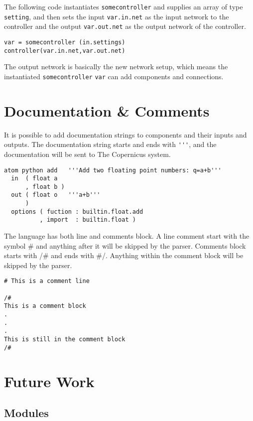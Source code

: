 The following code instantiates \verb#somecontroller# and supplies an
array of type \verb#setting#, and then sets the input
\verb#var.in.net# as the input network to the controller and the
output \verb#var.out.net# as the output network of the controller. 

\begin{verbatim}
var = somecontroller (in.settings)
controller(var.in.net,var.out.net)
\end{verbatim}

The output network is basically the new network setup, which means the
instantiated \verb#somecontroller# \verb#var# can add components and
connections.

\section{Documentation \& Comments}
It is possible to add documentation strings to components and their
inputs and outputs. The documentation string starts and ends with
\verb#'''#, and the documentation will be sent to The Copernicus
system.

\begin{verbatim}
atom python add   '''Add two floating point numbers: q=a+b'''
  in  ( float a
      , float b )
  out ( float o   '''a+b'''
      )
  options ( fuction : builtin.float.add
          , import  : builtin.float )
\end{verbatim}

The language has both line and comments block. A line comment start
with the symbol \# and anything after it will be skipped by the
parser. Comments block starts with /\# and ends with \#/. Anything
within the comment block will be skipped by the parser.

\begin{verbatim}
# This is a comment line

/#
This is a comment block
.
.
.
This is still in the comment block
/#
\end{verbatim}


\section{Future Work}

\subsection{Modules}

